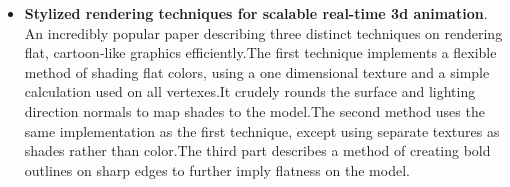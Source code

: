 \documentclass{acmsiggraph}
\begin{document}
\begin{itemize}
\item
\textbf{Stylized rendering techniques for scalable real-time 3d animation}.
An incredibly popular paper describing three distinct techniques on rendering
flat, cartoon-like graphics efficiently.The first technique implements a
flexible method of shading flat colors, using a one dimensional texture and a
simple calculation used on all vertexes.It crudely rounds the surface and
lighting direction normals to map shades to the model.The second method uses
the same implementation as the first technique, except using separate textures
as shades rather than color.The third part describes a method of creating
bold outlines on sharp edges to further imply flatness on the
model.\cite{lake2000srt}
\end{itemize}



\end{document}
